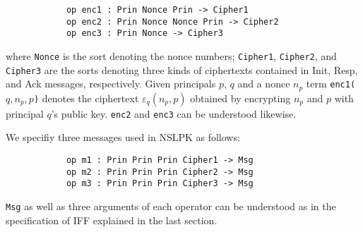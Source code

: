 \documentclass[10pt, conference, compsocconf]{IEEEtran}
\begin{document}
	
	\begin{small}
		\begin{verbatim}
			op enc1 : Prin Nonce Prin -> Cipher1
			op enc2 : Prin Nonce Nonce Prin -> Cipher2
			op enc3 : Prin Nonce -> Cipher3
		\end{verbatim}
	\end{small}
	
	\noindent
	where 
	\verb!Nonce! is the sort denoting the nonce numbers; 
	\verb!Cipher1!, \verb!Cipher2!, and \verb!Cipher3! are the sorts denoting three kinds of ciphertexts contained in Init, Resp, and Ack messages, respectively.
	Given principals $p$, $q$ and a nonce $n_p$ term \verb!enc1(!$q,n_p,p$\verb!)!
	denotes the ciphertext $\varepsilon_q(n_p, p)$ obtained by encrypting $n_p$ and $p$ with principal $q$'s public key.
	\verb!enc2! and \verb!enc3! can be understood likewise.
	
	
	We specifiy three messages used in NSLPK as follows:
	\begin{small}
		\begin{verbatim}
			op m1 : Prin Prin Prin Cipher1 -> Msg
			op m2 : Prin Prin Prin Cipher2 -> Msg
			op m3 : Prin Prin Prin Cipher3 -> Msg
		\end{verbatim}
	\end{small}
	
	\noindent
	\verb!Msg! as well as three arguments of each operator can be understood as in the specification of IFF explained in the last section.
	
\end{document}
